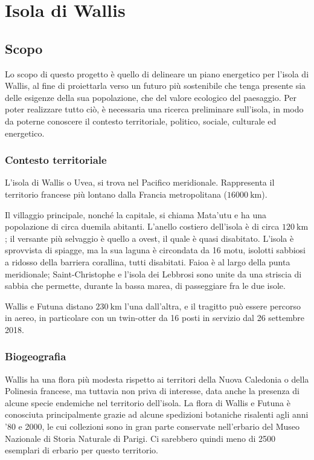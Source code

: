 \documentclass[fleqn,11pt]{SelfArx} %
\begin{document}
\maketitle

\tableofcontents

\thispagestyle{empty} %


\section{Isola di Wallis}

\subsection{Scopo}
Lo scopo di questo progetto è quello di delineare un piano energetico per l'isola di Wallis, al fine di proiettarla verso un futuro più sostenibile che tenga presente sia delle esigenze della sua popolazione, che del valore ecologico del paesaggio. Per poter realizzare tutto ciò, è necessaria una ricerca preliminare sull'isola, in modo da poterne conoscere il contesto territoriale, politico, sociale, culturale ed energetico.

\subsubsection{Contesto territoriale}
L'isola di Wallis o Uvea, si trova nel Pacifico meridionale.
Rappresenta il territorio francese più lontano dalla Francia metropolitana ($\SI{16000}{\km}$).

Il villaggio principale, nonché la capitale, si chiama Mata'utu e ha una popolazione di circa duemila abitanti.
L'anello costiero dell'isola è di circa $\SI{120}{\km}$; il versante più selvaggio è quello a ovest, il quale è quasi disabitato.
L'isola è sprovvista di spiagge, ma la sua laguna è circondata da 16 motu, isolotti sabbiosi a ridosso della barriera corallina, tutti disabitati.
Faioa è al largo della punta meridionale; Saint-Christophe e l'isola dei Lebbrosi sono unite da una striscia di sabbia che permette, durante la bassa marea, di passeggiare fra le due isole.

Wallis e Futuna distano $\SI{230}{\km}$ l'una dall'altra, e il tragitto può essere percorso in aereo, in particolare con un twin-otter da 16 posti in servizio dal 26 settembre 2018.

\subsubsection{Biogeografia}
Wallis ha una flora più modesta rispetto ai territori della Nuova Caledonia o della Polinesia francese, ma tuttavia non priva di interesse, data anche la presenza di alcune specie endemiche nel territorio dell'isola.
La flora di Wallis e Futuna è conosciuta principalmente grazie ad alcune spedizioni botaniche risalenti agli anni '80 e 2000, le cui collezioni sono in gran parte conservate nell'erbario del Museo Nazionale di Storia Naturale di Parigi.
Ci sarebbero quindi meno di 2500 esemplari di erbario per questo territorio. 
\end{document}

